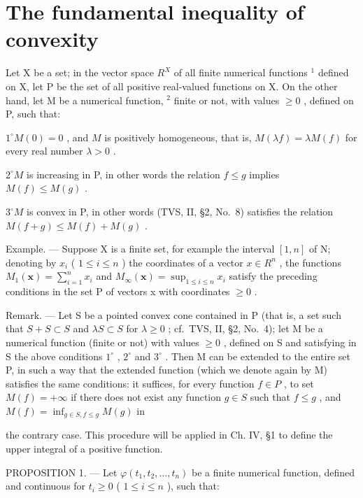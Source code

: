 \section{The fundamental inequality of convexity}

Let X be a set; in the vector space \(R^{X}\) of all finite numerical functions \(^{1}\) defined on X, let P be the set of all positive real-valued functions on X. On the other hand, let M be a numerical function, \(^{2}\) finite or not, with values \(\geqslant0\) , defined on P, such that:

\(1^{\circ} M(0) = 0\) , and \(M\) is positively homogeneous, that is, \(M(\lambda f) = \lambda M(f)\) for every real number \(\lambda > 0\) .

\(2^{\circ} M\) is increasing in P, in other words the relation \(f \leqslant g\) implies \(M(f) \leqslant M(g)\) .

\(3^{\circ} M\) is convex in P, in other words (TVS, II, §2, No.~8) satisfies the relation \(M(f + g) \leqslant M(f) + M(g)\) .

Example. --- Suppose X is a finite set, for example the interval \([1,n]\) of N; denoting by \(x_{i}\) ( \(1 \leqslant i \leqslant n\) ) the coordinates of a vector \(x \in R^{n}\) , the functions \(M_{1}(\mathbf{x}) = \sum_{i=1}^{n} x_{i}\) and \(M_{\infty}(\mathbf{x}) = \sup_{1 \leqslant i \leqslant n} x_{i}\) satisfy the preceding conditions in the set P of vectors x with coordinates \(\geqslant 0\) .

Remark. --- Let S be a pointed convex cone contained in P (that is, a set such that \(S + S \subset S\) and \(\lambda S \subset S\) for \(\lambda \geqslant 0\) ; cf.~TVS, II, §2, No.~4); let M be a numerical function (finite or not) with values \(\geqslant 0\) , defined on S and satisfying in S the above conditions \(1^{\circ}\) , \(2^{\circ}\) and \(3^{\circ}\) . Then M can be extended to the entire set P, in such a way that the extended function (which we denote again by M) satisfies the same conditions: it suffices, for every function \(f \in P\) , to set \(M(f) = +\infty\) if there does not exist any function \(g \in S\) such that \(f \leqslant g\) , and \(M(f) = \inf_{g \in S, f \leqslant g} M(g)\) in

the contrary case. This procedure will be applied in Ch. IV, §1 to define the upper integral of a positive function.

PROPOSITION 1. --- Let \(\varphi(t_{1}, t_{2}, \ldots, t_{n})\) be a finite numerical function, defined and continuous for \(t_{i} \geqslant 0\) ( \(1 \leqslant i \leqslant n\) ), such that:

